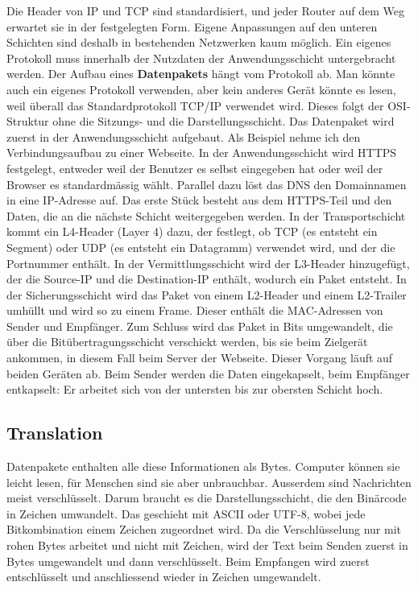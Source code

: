 Die Header von IP und TCP sind standardisiert, und jeder Router auf dem Weg erwartet sie in der festgelegten Form. Eigene Anpassungen auf den unteren Schichten sind deshalb in bestehenden Netzwerken kaum möglich. Ein eigenes Protokoll muss innerhalb der Nutzdaten der Anwendungsschicht untergebracht werden.
Der Aufbau eines \textbf{Datenpakets} hängt vom Protokoll ab. Man könnte auch ein eigenes Protokoll verwenden, aber kein anderes Gerät könnte es lesen, weil überall das Standardprotokoll TCP/IP verwendet wird. Dieses folgt der OSI-Struktur ohne die Sitzungs- und die Darstellungsschicht. Das Datenpaket wird zuerst in der Anwendungsschicht aufgebaut.\citep{networkchuckREALLIFEExample2020} Als Beispiel nehme ich den Verbindungsaufbau zu einer Webseite. In der Anwendungsschicht wird HTTPS festgelegt, entweder weil der Benutzer es selbst eingegeben hat oder weil der Browser es standardmässig wählt. Parallel dazu löst das DNS den Domainnamen in eine IP-Adresse auf. Das erste Stück besteht aus dem HTTPS-Teil und den Daten, die an die nächste Schicht weitergegeben werden. In der Transportschicht kommt ein L4-Header (Layer 4) dazu, der festlegt, ob TCP (es entsteht ein Segment) oder UDP (es entsteht ein Datagramm) verwendet wird, und der die Portnummer enthält. In der Vermittlungsschicht wird der L3-Header hinzugefügt, der die Source-IP und die Destination-IP enthält, wodurch ein Paket entsteht. In der Sicherungsschicht wird das Paket von einem L2-Header und einem L2-Trailer umhüllt und wird so zu einem Frame. Dieser enthält die MAC-Adressen von Sender und Empfänger. Zum Schluss wird das Paket in Bits umgewandelt, die über die Bitübertragungsschicht verschickt werden, bis sie beim Zielgerät ankommen, in diesem Fall beim Server der Webseite.
Dieser Vorgang läuft auf beiden Geräten ab. Beim Sender werden die Daten eingekapselt, beim Empfänger entkapselt: Er arbeitet sich von der untersten bis zur obersten Schicht hoch.

\subsection{Translation}
Datenpakete enthalten alle diese Informationen als Bytes. Computer können sie leicht lesen, für Menschen sind sie aber unbrauchbar. Ausserdem sind Nachrichten meist verschlüsselt. Darum braucht es die Darstellungsschicht, die den Binärcode in Zeichen umwandelt. Das geschieht mit ASCII oder UTF-8, wobei jede Bitkombination einem Zeichen zugeordnet wird. Da die Verschlüsselung nur mit rohen Bytes arbeitet und nicht mit Zeichen, wird der Text beim Senden zuerst in Bytes umgewandelt und dann verschlüsselt. Beim Empfangen wird zuerst entschlüsselt und anschliessend wieder in Zeichen umgewandelt.
